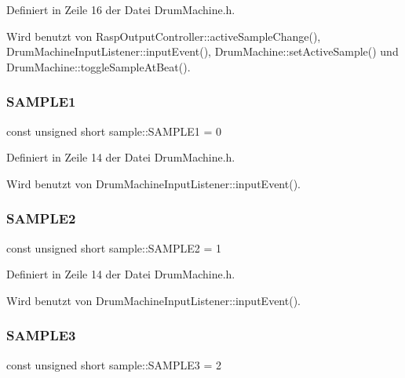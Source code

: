 Definiert in Zeile 16 der Datei Drum\+Machine.\+h.



Wird benutzt von Rasp\+Output\+Controller\+::active\+Sample\+Change(), Drum\+Machine\+Input\+Listener\+::input\+Event(), Drum\+Machine\+::set\+Active\+Sample() und Drum\+Machine\+::toggle\+Sample\+At\+Beat().

\mbox{\label{namespacesample_a59478bc0929eb3127ff4ed573d5abab5}} 
\subsubsection{\texorpdfstring{S\+A\+M\+P\+L\+E1}{SAMPLE1}}
{\footnotesize\ttfamily const unsigned short sample\+::\+S\+A\+M\+P\+L\+E1 = 0}



Definiert in Zeile 14 der Datei Drum\+Machine.\+h.



Wird benutzt von Drum\+Machine\+Input\+Listener\+::input\+Event().

\mbox{\label{namespacesample_a74decdde1db22f406d0a0cc1857534f4}} 
\subsubsection{\texorpdfstring{S\+A\+M\+P\+L\+E2}{SAMPLE2}}
{\footnotesize\ttfamily const unsigned short sample\+::\+S\+A\+M\+P\+L\+E2 = 1}



Definiert in Zeile 14 der Datei Drum\+Machine.\+h.



Wird benutzt von Drum\+Machine\+Input\+Listener\+::input\+Event().

\mbox{\label{namespacesample_ac0aab16a33bfcdbd978ad2efd28cd85a}} 
\subsubsection{\texorpdfstring{S\+A\+M\+P\+L\+E3}{SAMPLE3}}
{\footnotesize\ttfamily const unsigned short sample\+::\+S\+A\+M\+P\+L\+E3 = 2}



